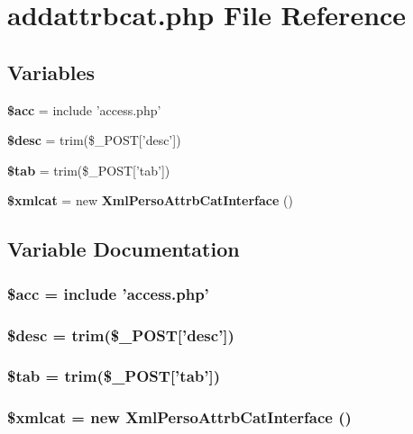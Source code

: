 \section{addattrbcat.php File Reference}
\label{addattrbcat_8php}


\subsection*{Variables}
\begin{CompactItemize}
\item 
{\bf \$acc} = include 'access.php'
\item 
{\bf \$desc} = trim(\$\_\-POST['desc'])
\item 
{\bf \$tab} = trim(\$\_\-POST['tab'])
\item 
{\bf \$xmlcat} = new {\bf Xml\-Perso\-Attrb\-Cat\-Interface} ()
\end{CompactItemize}


\subsection{Variable Documentation}
\subsubsection{\setlength{\rightskip}{0pt plus 5cm}\$acc = include 'access.php'}\label{addattrbcat_8php_542926c588a05eb69553d79c83cf73da}


\subsubsection{\setlength{\rightskip}{0pt plus 5cm}\$desc = trim(\$\_\-POST['desc'])}\label{addattrbcat_8php_31059b9e4d0c5af34df20da32232ea9a}


\subsubsection{\setlength{\rightskip}{0pt plus 5cm}\$tab = trim(\$\_\-POST['tab'])}\label{addattrbcat_8php_ab50d97eed7abd779caf1f2de48c1c5f}


\subsubsection{\setlength{\rightskip}{0pt plus 5cm}\$xmlcat = new {\bf Xml\-Perso\-Attrb\-Cat\-Interface} ()}\label{addattrbcat_8php_c13640948eba1327027aba9802d2c686}



